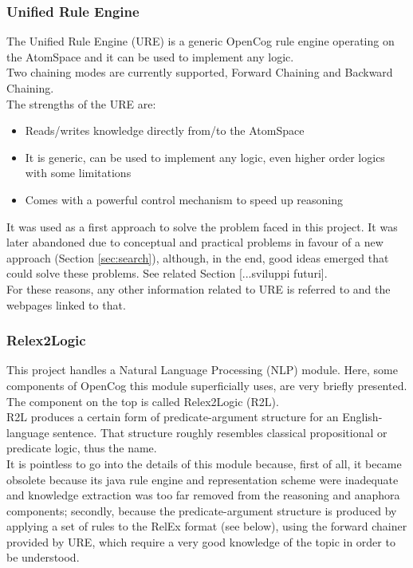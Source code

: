 \subsubsection{Unified Rule Engine}\label{sec:ure}

The Unified Rule Engine (URE) is a generic OpenCog rule engine operating on the AtomSpace and it can be used to implement any logic. \\
Two chaining modes are currently supported, Forward Chaining and Backward Chaining. \\
The strengths of the URE are:
\begin{itemize}
	\item Reads/writes knowledge directly from/to the AtomSpace
	\item It is generic, can be used to implement any logic, even higher order logics with some limitations
	\item Comes with a powerful control mechanism to speed up reasoning
\end{itemize}

It was used as a first approach to solve the problem faced in this project. It was later abandoned due to conceptual and practical problems in favour of a new approach (Section \ref{sec:search}), although, in the end, good ideas emerged that could solve these problems. See related Section [...sviluppi futuri]. \\
For these reasons, any other information related to URE is referred to \cite{geisweiller_2019} and the webpages linked to that.

\subsubsection{Relex2Logic}\label{sec:r2l}

This project handles a Natural Language Processing (NLP) module. Here, some components of OpenCog this module superficially uses, are very briefly presented. \\
The component on the top is called Relex2Logic (R2L). \\
R2L produces a certain form of predicate-argument structure for an English-language sentence. That structure roughly resembles classical propositional or predicate logic, thus the name. \\
It is pointless to go into the details of this module because, first of all, it became obsolete because its java rule engine and representation scheme were inadequate and knowledge extraction was too far removed from the reasoning and anaphora components; secondly, because the predicate-argument structure is produced by applying a set of rules to the RelEx format (see below), using the forward chainer provided by URE, which require a very good knowledge of the topic in order to be understood. \\

